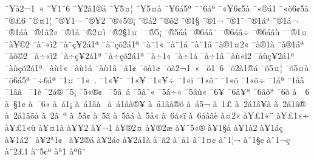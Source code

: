 {^^af^^a5^^e02^^ac1^^a0^^ab
^^af^^a51^^af6
^^af^^a52^^e01^^ae^^e1
^^af^^a55^^a4^^a6
^^af^^a55^^a4^^e0
^^af^^a56^^e15^^aa
^^af^^a86^^e1^^aa
^^af^^ab^^a56^^a25^^e0
^^af^^ab^^ae^^e11
^^af^^ab^^f56^^a25^^e0
^^af^^ae^^a36
^^af^^ae^^a41^^a6
^^af^^ae^^a51^^ac
^^af^^ae^^a52
^^af^^ae^^ab5^^ae^^a1
^^af^^ae^^e12
^^af^^ae^^f52
^^af^^ae1^^a7
^^af^^ae1^^ac^^ad
^^af^^ae1^^af
^^af^^ae1^^e1^^aa
^^af^^ae1^^e1^^ac
^^af^^ae1^^e1^^e5
^^af^^ae1^^e22^^ab
^^af^^ae1^^e5
^^af^^ae2^^a4^^ec
^^af^^ae2^^a71^^a4^^a0
^^af^^ae5^^a1
^^af^^ae5^^e1^^e1
^^af^^ae6^^e1^^e2^^a8
^^af^^ae6^^e1^^e2^^f7
^^af^^ae6^^e1^^e2^^f9
^^af^^af^^ae1^^a4
^^af^^e0^^a5^^a92
^^af^^e0^^a8^^ab^^ec2
^^af^^e0^^a8^^e7^^a52^^e11^^aa
^^af^^e0^^a8^^e7^^f52^^e11^^aa
^^af^^e0^^a81^^ab
^^af^^e0^^a81^^e1
^^af^^e0^^a81^^e2
^^af^^e0^^ae1^^a42^^ab
^^af^^e0^^ae1^^e0
^^af^^e0^^ae1^^e1^^aa
^^af^^e0^^f5^^a92
^^af^^e0^^f7^^ab^^ec2
^^af^^e0^^f7^^e7^^a52^^e11^^aa
^^af^^e0^^f7^^e7^^f52^^e11^^aa
^^af^^e0^^f71^^ab
^^af^^e0^^f71^^e1
^^af^^e0^^f71^^e2
^^af^^e0^^f9^^ab^^ec2
^^af^^e0^^f9^^e7^^a52^^e11^^aa
^^af^^e0^^f9^^e7^^f52^^e11^^aa
^^af^^e0^^f91^^ab
^^af^^e0^^f91^^e1
^^af^^e0^^f91^^e2
^^af^^e21^^a2
^^af^^f5^^e01^^a2
^^af^^f5^^e02^^ac1^^a0^^ab
^^af^^f51^^af6
^^af^^f52^^e01^^ae^^e1
^^af^^f55^^a4^^a6
^^af^^f55^^a4^^e0
^^af^^f56^^e15^^aa
^^af^^f76^^e1^^aa
^^af1^^a4
^^af1^^ab^^a0.
^^af1^^ab^^a5^^ad^^a8
^^af1^^ab^^a5^^ad^^ad
^^af1^^ab^^a5^^ad^^f7
^^af1^^ab^^ef
^^af1^^ab^^f5^^ad^^a8
^^af1^^ab^^f5^^ad^^ad
^^af1^^ab^^f5^^ad^^f7
^^af1^^e1^^aa
^^af1^^e2^^e0
^^af1^^e2^^e3^^a0
^^af1^^e9
^^af2^^e1^^ae
^^af5^^a1
^^af5^^ab^^ae^^a2^^a0
^^af5^^e2^^a0^^e2
^^af5^^e2^^a8^^ab
^^af5^^e2^^f7^^ab
^^af5^^e2^^f9^^ab
^^af6^^a5
^^af6^^e2^^a5^^aa
^^af6^^e2^^f5^^aa
^^af6^^f5
^^e0^^a0^^a06
^^e0^^a0^^a71^^a2
^^e0^^a0^^af6^^ab
^^e0^^a0^^e11^^a1
^^e0^^a0^^e11^^e2^^e0^^a0
^^e0^^a0^^e11^^e2^^e0^^ae^^a5
^^e0^^a0^^e11^^e2^^e0^^ae^^f5
^^e0^^a0^^e15^^ac
^^e0^^a01^^a3^^ad
^^e0^^a02^^e11^^e2^^a5^^e0
^^e0^^a02^^e11^^e2^^ae
^^e0^^a02^^e11^^e2^^f5^^e0
^^e0^^a02^^e2^^a0^^aa
^^e0^^a05^^e2^^a2
^^e0^^a05^^e3^^ad
^^e0^^a05^^e3^^e1
^^e0^^a05^^e5^^ab
^^e0^^a06^^e1^^ab^^ef
^^e0^^a06^^e1^^e2^^e3^^e8
^^e0^^a42^^ab
^^e0^^a5^^a31^^ab^^a8
^^e0^^a5^^a31^^ab^^f7
^^e0^^a5^^a31^^ab^^f9
^^e0^^a5^^a41^^e0
^^e0^^a5^^a52
^^e0^^a5^^ac1^^ad
^^e0^^a5^^ae2^^a4
^^e0^^a5^^ae2^^e6
^^e0^^a5^^af5^^ab^^ae
^^e0^^a51^^a7^^e0
^^e0^^a51^^e02
^^e0^^a51^^e1^^e7
^^e0^^a51^^e12^^af
^^e0^^a52^^aa1^^a2^^a0
^^e0^^a52^^ae^^e1
^^e0^^a52^^e1^^a2
^^e0^^a52^^e51^^e0
^^e0^^a8^^e32
^^e0^^a8^^e51
^^e0^^a81^^a4^^a2
^^e0^^a81^^a6^^ac
^^e0^^a81^^a7^^a2
^^e0^^a81^^ac^^e7
^^e0^^a82^^a31^^ad
^^e0^^a85^^a2^^aa
^^e0^^aa1^^ad
^^e0^^aa6^^ad^^a8
}
